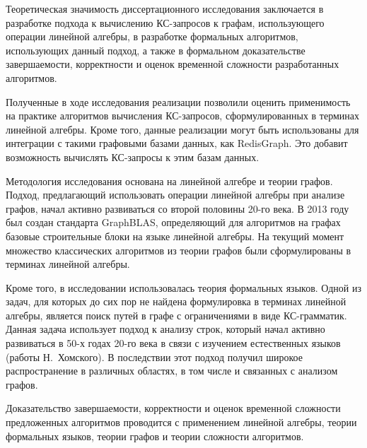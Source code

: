 {\influence} 
Теоретическая значимость диссертационного исследования заключается в разработке подхода к вычислению КС-запросов к графам, использующего операции линейной алгебры, в разработке формальных алгоритмов, использующих данный подход, а также в формальном доказательстве завершаемости, корректности и оценок временной сложности разработанных алгоритмов.

Полученные в ходе исследования реализации позволили оценить применимость на практике алгоритмов вычисления КС-запросов, сформулированных в терминах линейной алгебры. Кроме того, данные реализации могут быть использованы для интеграции с такими графовыми базами данных, как RedisGraph. Это добавит возможность вычислять КС-запросы к этим базам данных.

{\methods} Методология исследования основана на линейной алгебре и теории графов. Подход, предлагающий использовать операции линейной алгебры при анализе графов, начал активно развиваться со второй половины 20-го века. В 2013 году был создан стандарта GraphBLAS, определяющий для алгоритмов на графах базовые строительные блоки на языке линейной алгебры. На текущий момент множество классических алгоритмов из теории графов были сформулированы в терминах линейной алгебры.

Кроме того, в исследовании использовалась теория формальных языков. Одной из задач, для которых до сих пор не найдена формулировка в терминах линейной алгебры, является поиск путей в графе с ограничениями в виде КС-грамматик. Данная задача использует подход к анализу строк, который начал активно развиваться в 50-х годах 20-го века в связи с изучением естественных языков (работы Н.~Хомского). В последствии этот подход получил широкое распространение в различных областях, в том числе и связанных с анализом графов.

Доказательство завершаемости, корректности и оценок временной сложности предложенных алгоритмов проводится с применением линейной алгебры, теории формальных языков, теории графов и теории сложности алгоритмов.

